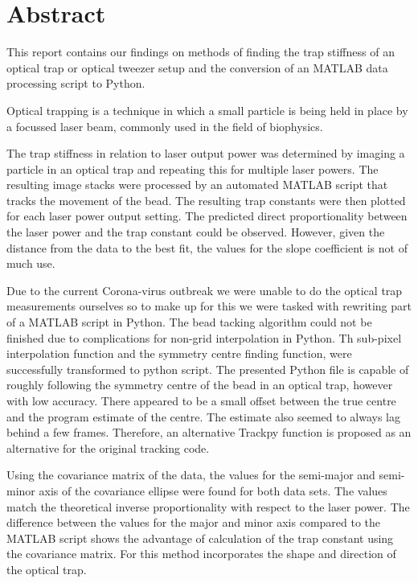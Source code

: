 \section{Abstract}
This report contains our findings on methods of finding the trap stiffness of an optical trap or optical tweezer setup and the conversion of an MATLAB data processing script to Python.

Optical trapping is a technique in which a small particle is being held in place by a focussed laser beam, commonly used in the field of biophysics.

The trap stiffness in relation to laser output power was determined by imaging a particle in an optical trap and repeating this for multiple laser powers. The resulting image stacks were processed by an automated MATLAB script that tracks the movement of the bead. The resulting trap constants were then plotted for each laser power output setting. The predicted direct proportionality between the laser power and the trap constant could be observed. However, given the distance from the data to the best fit, the values for the slope coefficient is not of much use.

Due to the current Corona-virus outbreak we were unable to do the optical trap measurements ourselves so to make up for this we were tasked with rewriting part of a MATLAB script in Python. The bead tacking algorithm could not be finished due to complications for non-grid interpolation in Python. Th sub-pixel interpolation function and the symmetry centre finding function, were successfully transformed to python script. The presented Python file is capable of roughly following the symmetry centre of the bead in an optical trap, however with low accuracy. There appeared to be a small offset between the true centre and the program estimate of the centre. The estimate also seemed to always lag behind a few frames. Therefore, an alternative Trackpy function is proposed as an alternative for the original tracking code.

Using the covariance matrix of the data, the values for the semi-major and semi-minor axis of the covariance ellipse were found for both data sets. The values match the theoretical inverse proportionality with respect to the laser power. The difference between the values for the major and minor axis compared to the MATLAB script shows the advantage of calculation of the trap constant using the covariance matrix. For this method incorporates the shape and direction of the optical trap.

